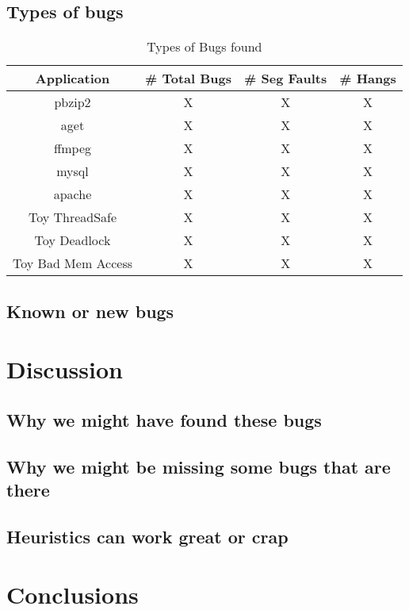 \documentclass[10pt,]{article} %
\begin{document}
\subsection{Types of bugs}

\begin{table}
\centering
\begin{tabular}{ |c|c|c|c| }
\hline
Application & \# Total Bugs & \# Seg Faults & \# Hangs \\ \hline \hline
pbzip2 & X & X & X  \\ \hline
aget   & X & X & X \\ \hline
ffmpeg & X & X & X \\ \hline
mysql  & X & X & X \\ \hline
apache & X & X & X \\ \hline
Toy ThreadSafe & X & X & X \\ \hline
Toy Deadlock   & X & X & X \\ \hline
Toy Bad Mem Access & X & X & X \\ \hline
\end{tabular}
\caption{Types of Bugs found}
\label{typeBugs}
\end{table}



\subsection{Known or new bugs}


\section{Discussion}


\subsection{Why we might have found these bugs}

\subsection{Why we might be missing some bugs that are there}

\subsection{Heuristics can work great or crap}


\section{Conclusions}
\end{document}
